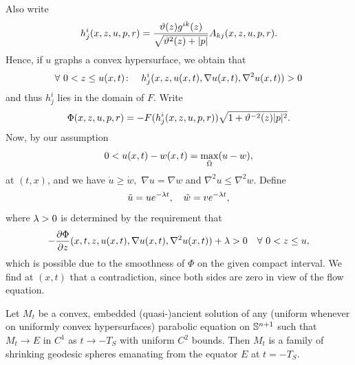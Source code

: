\documentclass{amsart}
\begin{document}
{Also write
$$h^i_j(x,z,u,p,r)=\fr{\vt(z)g^{ik}(z)}{\sqrt{\vt^2(z)+|p|}}A_{kj}(x,z,u,p,r).$$
Hence, if $u$ graphs a convex hypersurface, we obtain that
$$\forall~ 0<z\leq u(x,t)\cn\quad h^i_j(x,z,u(x,t),\nabla u(x,t),\nabla^2u(x,t))>0$$
 and thus $h^i_j$ lies in the domain of $F.$ Write
  $$\Phi(x,z,u,p,r)=-F(h^i_j(x,z,u,p,r))\sqrt{1+\vt^{-2}(z)|p|^2}.$$
Now, by our assumption 
 $$0<u(x,t)-w(x,t)=\max_{\-\O}(u-w),$$
 at $(t,x)$, and we have $\dot{u}\geq \dot{w},$ $\nabla u=\nabla w$ and $\nabla^2u\leq \nabla^2w.$ Define 
 $$\~u=ue^{-\l t},\quad \~w=ve^{-\l t},$$
 where $\l>0$ is determined by the requirement that
$$-\fr{\del\Phi}{\del z}(x,t,z,u(x,t),\nabla u(x,t),\nabla^2 u(x,t))+\l>0\quad\forall~ 0<z\leq u,
$$
 which is possible due to the smoothness of $\Phi$ on the given compact interval. We find at $(x,t)$ that
 a contradiction, since both sides are zero in view of the flow equation.
}
\begin{thm}
\label{thm:classification}
Let \(M_t\) be a convex, embedded (quasi-)ancient solution of any (uniform whenever on uniformly convex hypersurfaces) parabolic equation on \(\S^{n+1}\) such that \(M_t \to E\) in \(C^1\) as \(t \to -T_S\) with uniform \(C^2\) bounds. Then \(M_t\) is a family of shrinking geodesic spheres emanating from the equator \(E\) at \(t=-T_S\).
\end{thm}
\end{document}
